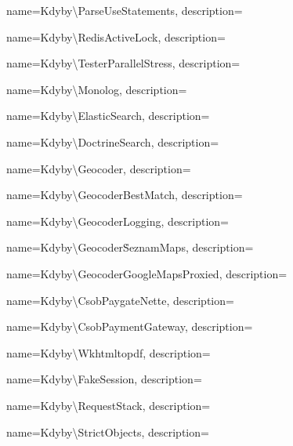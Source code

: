  {
  name={Kdy\-by\textbackslash{}Par\-se\-Use\-Sta\-te\-men\-ts},
  description={} }

 {
  name={Kdy\-by\textbackslash{}Re\-dis\-Acti\-ve\-Lock},
  description={} }

 {
  name={Kdy\-by\textbackslash{}Tes\-ter\-Pa\-ra\-ll\-el\-St\-ress},
  description={} }

 {
  name={Kdy\-by\textbackslash{}Mo\-no\-log},
  description={} }

 {
  name={Kdy\-by\textbackslash{}Elastic\-Sear\-ch},
  description={} }

 {
  name={Kdy\-by\textbackslash{}Doc\-tri\-ne\-Sear\-ch},
  description={} }

 {
  name={Kdy\-by\textbackslash{}Geo\-co\-der},
  description={} }

 {
  name={Kdy\-by\textbackslash{}Geo\-co\-der\-Be\-st\-Ma\-tch},
  description={} }

 {
  name={Kdy\-by\textbackslash{}Geo\-co\-der\-Log\-g\-ing},
  description={} }

 {
  name={Kdy\-by\textbackslash{}Geo\-co\-der\.Se\-z\-nam\-Ma\-ps},
  description={} }

 {
  name={Kdy\-by\textbackslash{}Geo\-co\-der\-Goo\-gle\-Ma\-ps\-Pro\-xi\-ed},
  description={} }

 {
  name={Kdy\-by\textbackslash{}C\-s\-o\-b\-Pay\-ga\-te\-Ne\-tte},
  description={} }

 {
  name={Kdy\-by\textbackslash{}C\-s\-o\-b\-Pay\-me\-nt\-Ga\-te\-way},
  description={} }

 {
  name={Kdy\-by\textbackslash{}Wk\-html\-to\-pdf},
  description={} }

 {
  name={Kdy\-by\textbackslash{}Fa\-ke\-Ses\-si\-on},
  description={} }

 {
  name={Kdy\-by\textbackslash{}Re\-que\-st\-Sta\-ck},
  description={} }

 {
  name={Kdy\-by\textbackslash{}Stri\-ct\-Ob\-je\-ct\-s},
  description={} }

